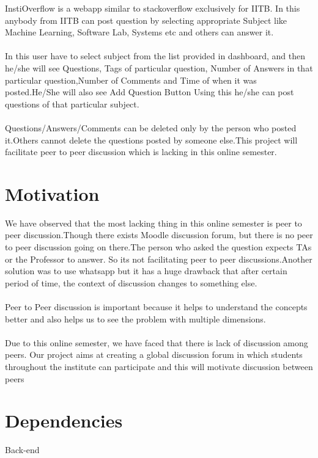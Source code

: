 \documentclass[12pt]{article}
\begin{document}
InstiOverflow is a webapp similar to stackoverflow exclusively for IITB. In this anybody
from IITB can post question by selecting appropriate Subject like Machine Learning, Software Lab,
Systems etc and others can answer it.\\\\
In this user have to select subject from the list provided in dashboard, and then he/she will see Questions, Tags of particular question, Number of Answers in that particular question,Number of Comments and Time of when it was posted.He/She will also see Add Question Button Using this he/she can post questions of that particular subject.\\\\
Questions/Answers/Comments can be deleted only by the person who posted it.Others cannot delete the questions posted by someone else.This project will facilitate peer to peer discussion which is lacking in this online semester.



\section{Motivation}
We have observed that the most lacking thing in this online semester is peer to peer discussion.Though there exists Moodle discussion forum, but there is no peer to peer discussion going on there.The person who asked the question expects TAs or the Professor to answer. So its not facilitating peer to peer discussions.Another solution was to use whatsapp but it has a huge drawback that after certain period of time, the context of discussion changes to something else.\\\\
Peer to Peer discussion is important because it helps to understand the concepts better and also helps us to see the problem with multiple dimensions.\\\\
Due to this online semester, we have faced that there is lack of discussion
among peers. Our project aims at creating a global discussion forum in which
students throughout the institute can participate and this will motivate
discussion between peers

\section{Dependencies}
\begin{large}
	Back-end
\end{large}
\end{document}
